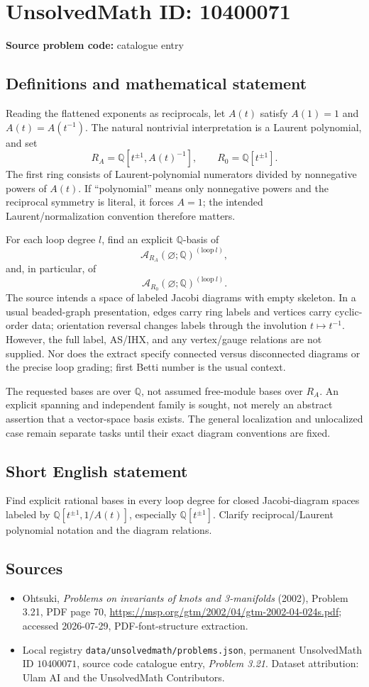 \documentclass[11pt]{article}
\begin{document}
\section*{UnsolvedMath ID: 10400071}
\textbf{Source problem code:} catalogue entry
\subsection{Definitions and mathematical statement}
Reading the flattened exponents as reciprocals, let $A(t)$ satisfy $A(1)=1$ and $A(t)=A(t^{-1})$. The natural nontrivial interpretation is a Laurent polynomial, and set
\[
R_A=\mathbb Q[t^{\pm1},A(t)^{-1}],\qquad R_0=\mathbb Q[t^{\pm1}].
\]
The first ring consists of Laurent-polynomial numerators divided by nonnegative powers of $A(t)$. If ``polynomial'' means only nonnegative powers and the reciprocal symmetry is literal, it forces $A=1$; the intended Laurent/normalization convention therefore matters.

For each loop degree $l$, find an explicit $\mathbb Q$-basis of
\[
\mathcal A_{R_A}(\varnothing;\mathbb Q)^{(\mathrm{loop}\ l)},
\]
and, in particular, of
\[
\mathcal A_{R_0}(\varnothing;\mathbb Q)^{(\mathrm{loop}\ l)}.
\]
The source intends a space of labeled Jacobi diagrams with empty skeleton. In a usual beaded-graph presentation, edges carry ring labels and vertices carry cyclic-order data; orientation reversal changes labels through the involution $t\mapsto t^{-1}$. However, the full label, AS/IHX, and any vertex/gauge relations are not supplied. Nor does the extract specify connected versus disconnected diagrams or the precise loop grading; first Betti number is the usual context.

The requested bases are over $\mathbb Q$, not assumed free-module bases over $R_A$. An explicit spanning and independent family is sought, not merely an abstract assertion that a vector-space basis exists. The general localization and unlocalized case remain separate tasks until their exact diagram conventions are fixed.
\subsection{Short English statement}
Find explicit rational bases in every loop degree for closed Jacobi-diagram spaces labeled by $\mathbb Q[t^{\pm1},1/A(t)]$, especially $\mathbb Q[t^{\pm1}]$. Clarify reciprocal/Laurent polynomial notation and the diagram relations.
\subsection{Sources}
\begin{itemize}
\item Ohtsuki, \emph{Problems on invariants of knots and 3-manifolds} (2002), Problem 3.21, PDF page 70, \url{https://msp.org/gtm/2002/04/gtm-2002-04-024s.pdf}; accessed 2026-07-29, PDF-font-structure extraction.
\item Local registry \texttt{data/unsolvedmath/problems.json}, permanent UnsolvedMath ID $10400071$, source code catalogue entry, \emph{Problem 3.21}. Dataset attribution: Ulam AI and the UnsolvedMath Contributors.
\end{itemize}
\end{document}
